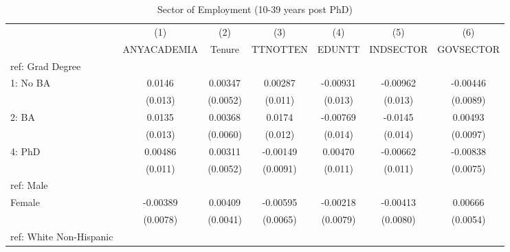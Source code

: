 \begin{table}[htbp]\centering
\def\sym#1{\ifmmode^{#1}\else\(^{#1}\)\fi}
\caption{Sector of Employment (10-39 years post PhD) \label{tab1}}
\begin{tabular}{l*{6}{c}}
\hline\hline
  &\multicolumn{1}{c}{(1)}&\multicolumn{1}{c}{(2)}&\multicolumn{1}{c}{(3)}&\multicolumn{1}{c}{(4)}&\multicolumn{1}{c}{(5)}&\multicolumn{1}{c}{(6)}\\
  &\multicolumn{1}{c}{ANYACADEMIA}&\multicolumn{1}{c}{Tenure}&\multicolumn{1}{c}{TTNOTTEN}&\multicolumn{1}{c}{EDUNTT}&\multicolumn{1}{c}{INDSECTOR}&\multicolumn{1}{c}{GOVSECTOR}\\
\hline
ref: Grad Degree&                     &                     &                     &                     &                     &                     \\
[1em]
1: No BA&      0.0146         &     0.00347         &     0.00287         &    -0.00931         &    -0.00962         &    -0.00446         \\
  &     (0.013)         &    (0.0052)         &     (0.011)         &     (0.013)         &     (0.013)         &    (0.0089)         \\
[1em]
2: BA&      0.0135         &     0.00368         &      0.0174         &    -0.00769         &     -0.0145         &     0.00493         \\
  &     (0.013)         &    (0.0060)         &     (0.012)         &     (0.014)         &     (0.014)         &    (0.0097)         \\
[1em]
4: PhD&     0.00486         &     0.00311         &    -0.00149         &     0.00470         &    -0.00662         &    -0.00838         \\
  &     (0.011)         &    (0.0052)         &    (0.0091)         &     (0.011)         &     (0.011)         &    (0.0075)         \\
[1em]
ref: Male&                     &                     &                     &                     &                     &                     \\
[1em]
Female&    -0.00389         &     0.00409         &    -0.00595         &    -0.00218         &    -0.00413         &     0.00666         \\
  &    (0.0078)         &    (0.0041)         &    (0.0065)         &    (0.0079)         &    (0.0080)         &    (0.0054)         \\
[1em]
ref: White Non-Hispanic&                     &                     &                     &                     &                     &                     \\

\end{tabular}
\end{table}
